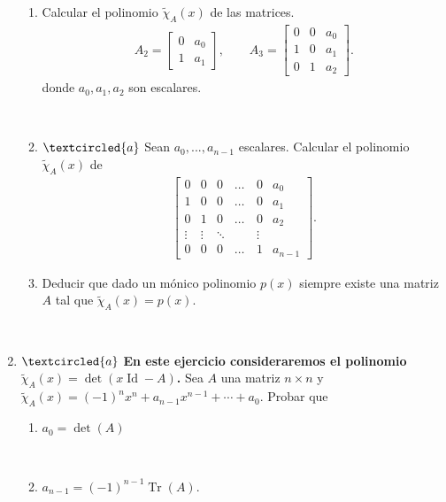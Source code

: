 \documentclass[12pt]{amsart}
\begin{document}
\begin{enumerate}[resume]
\begin{enumerate}
\item  Calcular el polinomio $\tilde\chi_A(x)$ de las matrices.
\begin{align*}
A_2=\begin{bmatrix} 0 & a_0 \\ 1 & a_1
\end{bmatrix},\quad\quad
A_3=\begin{bmatrix} 0 & 0 & a_0 \\ 1 & 0 & a_1 \\ 0 & 1 & a_2
\end{bmatrix}.
\end{align*}
donde $a_0, a_1, a_2$ son escalares.

\
\item\label{matriz de un polinomio} $\textcircled{a}$ Sean $a_0, ..., a_{n-1}$ escalares. Calcular el polinomio $\tilde\chi_A(x)$ de
\begin{align*}
\begin{bmatrix} 0 & 0 & 0 &\dots & 0 & a_0 \\ 1 & 0 & 0&  \dots & 0  & a_1 \\ 0 & 1 & 0&  \dots & 0  & a_2 \\ \vdots & \vdots & \ddots & \quad  & \vdots\\ 0 & 0 & 0 & \dots & 1  & a_{n-1}
\end{bmatrix}.		
 \end{align*}

 \item Deducir que dado un m\'onico polinomio $p(x)$ siempre existe una matriz $A$ tal que $\tilde\chi_A(x)=p(x)$.


\end{enumerate}

\


\item\label{tr det}$\textcircled{a}$ {\bf En este ejercicio consideraremos el polinomio $\tilde\chi_A(x)=\det(x\operatorname{Id}-A)$.}
Sea $A$ una matriz $n \times n$ y $\tilde\chi_A(x)=(-1)^nx^n+a_{n-1}x^{n-1}+\cdots+a_0$. Probar que
\begin{multicols}{2}
\begin{enumerate}
	\item $a_0=\det(A)$
	
	\
	
	\item $a_{n-1}=(-1)^{n-1}\operatorname{Tr}(A)$.
\end{enumerate}
\end{multicols}


\end{enumerate}
\end{document}
